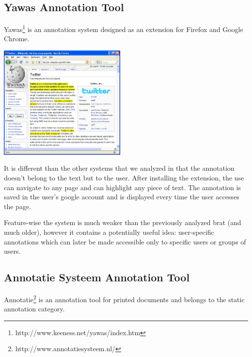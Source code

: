 \documentclass[a4paper, 12pt, notitlepage]{report}
\begin{document}
\subsection{Yawas Annotation Tool} %
Yawas\footnote{http://www.keeness.net/yawas/index.htm} is an annotation system designed as an extension for Firefox and Google Chrome.\\[0.1in]
\begin{center}
\includegraphics[width=2.5in]{yawas.jpg}
\end{center}
It is different than the other systems that we analyzed in that the annotation doesn't belong to the text but to the user. After installing the extension, the use can navigate to any page
and can highlight any piece of text. The annotation is saved in the user's google account and is displayed every time the user accesses the page.\vspace{10pt}

Feature-wise the system is much weaker than the previously analyzed brat (and much older), however it contains a potentially useful idea: user-specific annotations which can later be made accessible only to
specific users or groups of users.
 


\subsection{Annotatie Systeem Annotation Tool} %
Annotatie\footnote{http://www.annotatiesysteem.nl/} is an annotation tool for printed documents and belongs to the static annotation category.\vspace{10pt}
\end{document}
